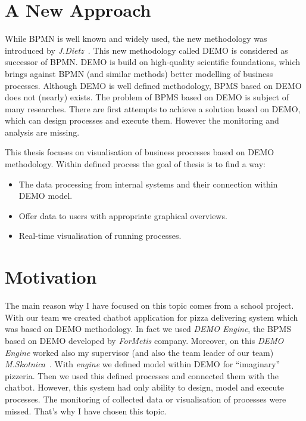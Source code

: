 \section{A New Approach}
While BPMN is well known and widely used, the new methodology was introduced by \textit{J.Dietz}~\cite{dietz-essence-2015}. This new methodology called DEMO is considered as successor of BPMN. DEMO is build on high-quality scientific foundations, which brings against BPMN (and similar methods) better modelling of business processes. Although DEMO is well defined methodology, BPMS based on DEMO does not (nearly) exists. The problem of BPMS based on DEMO is subject of many researches. There are first attempts to achieve a solution based on DEMO, which can design processes and execute them. However the monitoring and analysis are missing.

This thesis focuses on visualisation of business processes based on DEMO methodology. Within defined process the goal of thesis is to find a way:

\begin{itemize}
\item The data processing from internal systems and their connection within DEMO model. 
\item Offer data to users with appropriate graphical overviews.
\item Real-time visualisation of running processes.
\end{itemize}

\section{Motivation}
The main reason why I have focused on this topic comes from a school project. With our team we created chatbot application for pizza delivering system which was based on DEMO methodology. In fact we used \textit{DEMO Engine}, the BPMS based on DEMO developed by \textit{ForMetis} company. Moreover, on this \textit{DEMO Engine} worked also my supervisor (and also the team leader of our team) \textit{M.Skotnica}~\cite{diploma-skotnica-2016}. With \textit{engine} we defined model within DEMO for ``imaginary'' pizzeria. Then we used this defined processes and connected them with the chatbot. However, this system had only ability to design, model and execute processes. The monitoring of collected data or visualisation of processes were missed. That's why I have chosen this topic.

